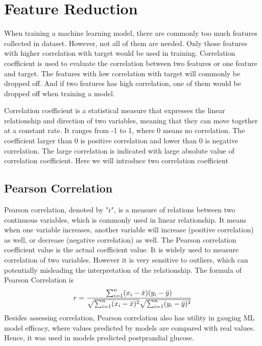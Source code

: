 \documentclass[12pt,a4paper,english
]{tunithesis}
\begin{document}
\section{Feature Reduction}
When training a machine learning model, there are commonly too much features collected in dataset. However, not all of them are needed. Only those features with higher correlation with target would be used in training. Correlation coefficient is used to evaluate the correlation between two features or one feature and target. The features with low correlation with target will commonly be dropped off. And if two features has high correlation, one of them would be dropped off when training a model. 

Correlation coefficient is a statistical measure that expresses the linear relationship and direction of two variables, meaning that they can move together at a constant rate. It ranges from -1 to 1, where 0 means no correlation. The coefficient larger than 0 is positive correlation and lower than 0 is negative correlation. The large correlation is indicated with large absolute value of correlation coefficient. Here we will introduce two correlation coefficient

\subsection{Pearson Correlation}
Pearson correlation, denoted by "r", is a measure of relations between two continuous variables, which is commonly used in linear relationship. It means when one variable increases, another variable will increase (positive correlation) as well, or decrease (negative correlation) as well. The Pearson correlation coefficient value is the actual coefficient value. It is widely used to measure correlation of two variables. However it is very sensitive to outliers, which can potentially misleading the interpretation of the relationship. The formula of Pearson Correlation is
\begin{equation}
  r =
  \frac{ \sum_{i=1}^{n}(x_i-\bar{x})(y_i-\bar{y}) }{%
        \sqrt{\sum_{i=1}^{n}(x_i-\bar{x})^2}\sqrt{\sum_{i=1}^{n}(y_i-\bar{y})^2}}
\end{equation}
Besides assessing correlation, Pearson correlation also has utility in gauging ML model efficacy, where values predicted by models are compared with real values. Hence, it was used in models predicted postprandial glucose. \parencite{kirk2021} 
\end{document}
